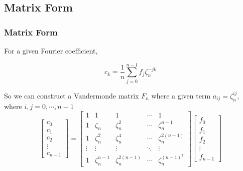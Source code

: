 \documentclass{beamer}
\begin{document}
\subsection{Matrix Form}
\begin{frame}
	\frametitle{Matrix Form}
For a given Fourier coefficient,

\[
	{c}_k = \frac{1}{n}\sum_{j=0}^{n-1} f_j \zeta_n^{-jk}
\]

So we can construct a Vandermonde matrix $F_n$ where a given term $a_{ij} = \zeta_n^{ij}$, where $i,j = 0, \cdots, {n-1}$
\[
	\begin{bmatrix}
		c_{0} \\
		c_{1} \\
		c_{2} \\
		\vdots \\
		c_{n-1} 
	\end{bmatrix}
	=
	\begin{bmatrix}
		1 & 1 & 1 & \cdots & 1 \\
		1 & \zeta_n & \zeta_n^2 & \cdots & \zeta_n^{n-1} \\
		1 & \zeta_n^2 & \zeta_n^4 & \cdots & \zeta_n^{2(n-1)} \\
		\vdots & \vdots & \vdots & \ddots & \vdots \\
		1 & \zeta_n^{n-1} & \zeta_n^{2(n-1)} & \cdots & \zeta_n^{(n-1)^2}
	\end{bmatrix}
	\begin{bmatrix}
		f_0 \\
		f_1 \\
		f_2 \\
		\vdots \\
		f_{n-1}
	\end{bmatrix}
\]
\end{frame}
\end{document}
